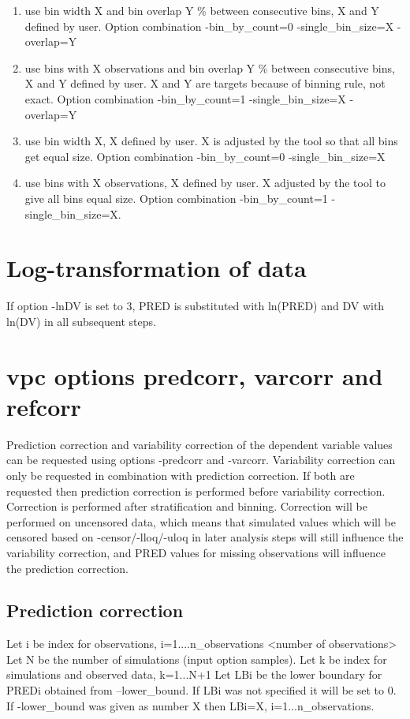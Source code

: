 \begin{enumerate}
	\item use bin width X and bin overlap Y \% between consecutive bins, X and Y defined by user. Option combination -bin\_by\_count=0 -single\_bin\_size=X -overlap=Y
	\item use bins with X observations and bin overlap Y \% between consecutive bins, X and Y defined by user.  X and Y are targets because of binning rule, not exact. Option combination -bin\_by\_count=1 -single\_bin\_size=X -overlap=Y
	\item use bin width X, X defined by user. X is adjusted by the tool so that all bins get equal size. Option combination -bin\_by\_count=0 -single\_bin\_size=X
	\item use bins with X observations, X defined by user. X adjusted by the tool to give all bins equal size. Option combination -bin\_by\_count=1 -single\_bin\_size=X.
\end{enumerate}

\section{Log-transformation of data}
If option -lnDV is set to 3,  PRED is substituted with ln(PRED) and DV with ln(DV) in all subsequent steps. 

\section{vpc options predcorr, varcorr and refcorr}
Prediction correction and variability correction of the dependent variable values can be requested using options -predcorr and -varcorr. Variability correction can only be requested in combination with prediction correction. If both are requested then prediction correction is performed before variability correction. Correction is performed after stratification and binning. Correction will be performed on uncensored data, which means that simulated values which will be censored based on -censor/-lloq/-uloq in later analysis steps will still influence the variability correction, and PRED values for missing observations will influence the prediction correction.

\subsection{Prediction correction}
Let i be index for observations, i=1....n\_observations <number of observations>
Let N be the number of simulations (input option samples).
Let k be index for simulations and observed data, k=1...N+1
Let LBi be the lower boundary for PREDi obtained from –lower\_bound. If LBi was not specified it will be set to 0. If -lower\_bound was given as number X then LBi=X, i=1...n\_observations.


